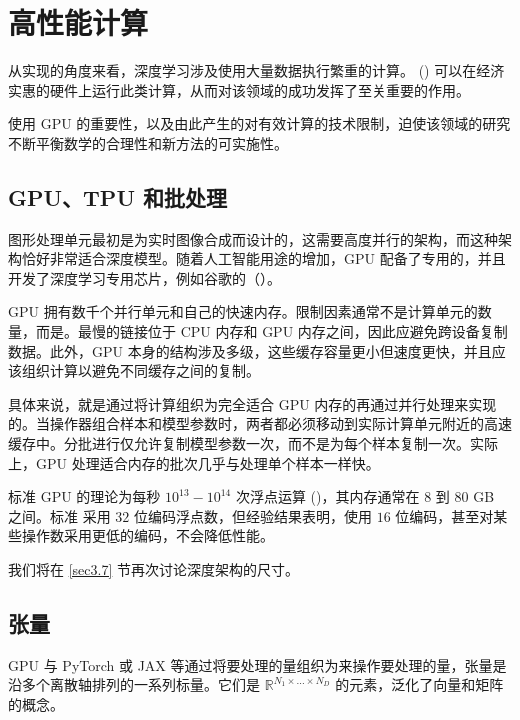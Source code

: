 \chapter{高性能计算}\label{ch2}

从实现的角度来看，深度学习涉及使用大量数据执行繁重的计算。 () 可以在经济实惠的硬件上运行此类计算，从而对该领域的成功发挥了至关重要的作用。

使用 GPU 的重要性，以及由此产生的对有效计算的技术限制，迫使该领域的研究不断平衡数学的合理性和新方法的可实施性。

\section{GPU、TPU 和批处理}\label{sec2.1}

图形处理单元最初是为实时图像合成而设计的，这需要高度并行的架构，而这种架构恰好非常适合深度模型。随着人工智能用途的增加，GPU 配备了专用的，并且开发了深度学习专用芯片，例如谷歌的（）。

GPU 拥有数千个并行单元和自己的快速内存。限制因素通常不是计算单元的数量，而是。最慢的链接位于 CPU 内存和 GPU 内存之间，因此应避免跨设备复制数据。此外，GPU 本身的结构涉及多级，这些缓存容量更小但速度更快，并且应该组织计算以避免不同缓存之间的复制。

具体来说，就是通过将计算组织为完全适合 GPU 内存的再通过并行处理来实现的。当操作器组合样本和模型参数时，两者都必须移动到实际计算单元附近的高速缓存中。分批进行仅允许复制模型参数一次，而不是为每个样本复制一次。实际上，GPU 处理适合内存的批次几乎与处理单个样本一样快。

标准 GPU 的理论为每秒 $10^{13}-10^{14}$ 次浮点运算 ()，其内存通常在 $8$ 到 $80$ GB 之间。标准  采用 $32$ 位编码浮点数，但经验结果表明，使用 $16$ 位编码，甚至对某些操作数采用更低的编码，不会降低性能。

我们将在 \ref{sec3.7} 节再次讨论深度架构的尺寸。

\section{张量}\label{sec2.2}

GPU 与 PyTorch 或 JAX 等通过将要处理的量组织为来操作要处理的量，张量是沿多个离散轴排列的一系列标量。它们是 $\mathbb{R}^{N_1 \times \dots \times N_D}$ 的元素，泛化了向量和矩阵的概念。

